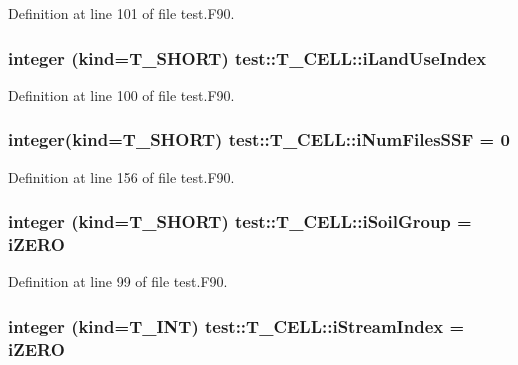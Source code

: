 Definition at line 101 of file test.F90.

\hypertarget{typetest_1_1_t___c_e_l_l_ad239019dcd29e3373497a82bc48f310d}{
\subsubsection[{iLandUseIndex}]{\setlength{\rightskip}{0pt plus 5cm}integer (kind={\bf T\_\-SHORT}) {\bf test::T\_\-CELL::iLandUseIndex}}}
\label{typetest_1_1_t___c_e_l_l_ad239019dcd29e3373497a82bc48f310d}


Definition at line 100 of file test.F90.

\hypertarget{typetest_1_1_t___c_e_l_l_a8812998b5d87adc1af2ac71a4e83d116}{
\subsubsection[{iNumFilesSSF}]{\setlength{\rightskip}{0pt plus 5cm}integer(kind={\bf T\_\-SHORT}) {\bf test::T\_\-CELL::iNumFilesSSF} = 0}}
\label{typetest_1_1_t___c_e_l_l_a8812998b5d87adc1af2ac71a4e83d116}


Definition at line 156 of file test.F90.

\hypertarget{typetest_1_1_t___c_e_l_l_adb1b85c6578fcf90e12c8a4200bbb8a8}{
\subsubsection[{iSoilGroup}]{\setlength{\rightskip}{0pt plus 5cm}integer (kind={\bf T\_\-SHORT}) {\bf test::T\_\-CELL::iSoilGroup} = {\bf iZERO}}}
\label{typetest_1_1_t___c_e_l_l_adb1b85c6578fcf90e12c8a4200bbb8a8}


Definition at line 99 of file test.F90.

\hypertarget{typetest_1_1_t___c_e_l_l_a41caa3a0237d549e0c76e53b3cb0aef3}{
\subsubsection[{iStreamIndex}]{\setlength{\rightskip}{0pt plus 5cm}integer (kind={\bf T\_\-INT}) {\bf test::T\_\-CELL::iStreamIndex} = {\bf iZERO}}}
\label{typetest_1_1_t___c_e_l_l_a41caa3a0237d549e0c76e53b3cb0aef3}


